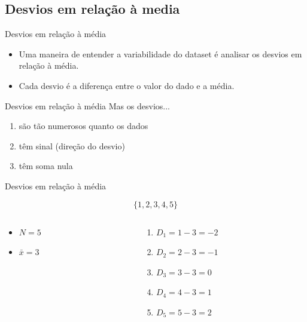 \documentclass{beamer}
\begin{document}
\subsection{Desvios em relação à media}
\begin{frame}{Desvios em relação à média}
  \begin{itemize}
  \item Uma maneira de entender a variabilidade do dataset é analisar
    os desvios em relação à média.
  \item Cada desvio é a diferença entre o valor do dado e a média.
  \end{itemize}
\end{frame}

\begin{frame}{Desvios em relação à média}
  Mas os desvios...
  \begin{enumerate}
  \item são tão numerosos quanto os dados
  \item têm sinal (direção do desvio)
  \item têm soma \alert{nula}
  \end{enumerate}
\end{frame}

\begin{frame}{Desvios em relação à média}
\begin{example}
  \begin{displaymath}
    \{1,2,3,4,5\}
  \end{displaymath}

  \begin{columns}
    \begin{column}{5cm}
  \begin{itemize}
  \item $N=5$
  \item $\bar{x} = 3$
  \end{itemize}
\end{column}
\begin{column}{5cm}
  \begin{enumerate}
  \item $D_1 = 1-3 = -2$
  \item $D_2 = 2-3 = -1$
  \item $D_3 = 3-3 = 0$
  \item $D_4 = 4-3 = 1$
  \item $D_5 = 5-3 = 2$
  \end{enumerate}
\end{column}
\end{columns}
\end{example}
\end{frame}
\end{document}
